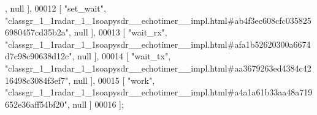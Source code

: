 \begin{DoxyCode}
      , null ],
00012     [ \textcolor{stringliteral}{"set\_wait"}, \textcolor{stringliteral}{"classgr\_1\_1radar\_1\_1soapysdr\_\_echotimer\_\_impl.html#ab4f3ec608cfc0358256980457cd35b2a"}, 
      null ],
00013     [ \textcolor{stringliteral}{"wait\_rx"}, \textcolor{stringliteral}{"classgr\_1\_1radar\_1\_1soapysdr\_\_echotimer\_\_impl.html#afa1b52620300a6674d7c98c90638d12c"}, 
      null ],
00014     [ \textcolor{stringliteral}{"wait\_tx"}, \textcolor{stringliteral}{"classgr\_1\_1radar\_1\_1soapysdr\_\_echotimer\_\_impl.html#aa3679263ed4384c4216498c3084f3ef7"}, 
      null ],
00015     [ \textcolor{stringliteral}{"work"}, \textcolor{stringliteral}{"classgr\_1\_1radar\_1\_1soapysdr\_\_echotimer\_\_impl.html#a4a1a61b33aa48a719652e36aff54bf20"}, null 
      ]
00016 ];
\end{DoxyCode}
